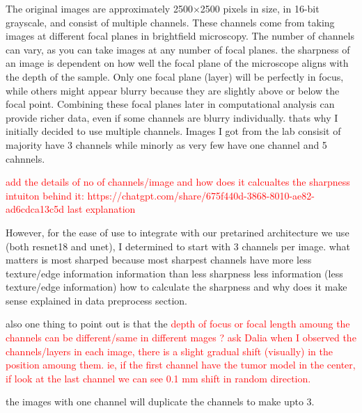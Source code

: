 The original images are approximately 2500×2500 pixels in size, in 16-bit grayscale,
 and consist of multiple channels. These channels come from taking images at different 
 focal planes in brightfield microscopy. The number of channels can vary, as you can take
  images at any number of focal planes. the sharpness of an image is dependent 
  on how well the focal plane of the microscope aligns with the depth of the sample. Only one focal plane
   (layer) will be perfectly in focus, while others might appear blurry because they are slightly above 
   or below the focal point. Combining these focal planes later in computational analysis can provide richer data,
    even if some channels are blurry individually. thats why I initially decided to use multiple channels.
  Images I got from the lab consisit of majority have 3 channels while minorly as very few have one channel and 
  5 cahnnels.

  \textcolor{red}{add the details of no of channels/image and how does it calcualtes the sharpness intuiton behind it: https://chatgpt.com/share/675f440d-3868-8010-ae82-ad6cdca13c5d last explanation}

  However, for the ease of use to integrate with our pretarined architecture we use (both resnet18 and unet),
  I determined to start with 3 channels per image. 
what matters is  most sharped because 
  most sharpest channels have more less texture/edge information information than less sharpness 
 less information (less texture/edge information) 
  how to calculate the sharpness and why does it make sense explained in data preprocess section.

  also one thing to point out is that the   \textcolor{red}{depth of focus or focal length amoung the channels can be different/same in different mages ? ask Dalia}
  \textcolor{red}{when I observed the channels/layers in each image, there is a slight gradual shift (visually) in the position amoung them. ie, if the first channel
   have the tumor model in the center, if look at the last channel we can see 0.1 mm shift in random direction.} 

  the images with one channel will duplicate the channels to make upto 3.
  
